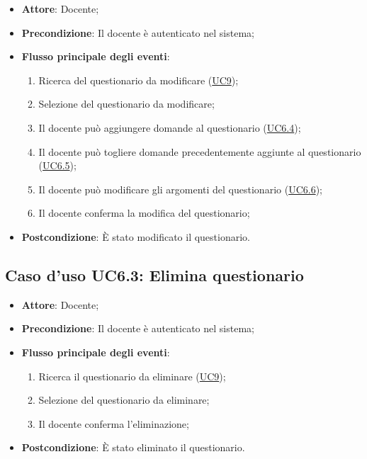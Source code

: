 \documentclass[12pt,a4paper]{article}
\begin{document}
\begin{itemize}

\item \textbf{Attore}: Docente; 
\item \textbf{Precondizione}: Il docente è autenticato nel sistema;

\item \textbf{Flusso principale degli eventi}:
\begin{enumerate}
	\item Ricerca del questionario da modificare (\hyperlink{UC9}{UC9});
	\item Selezione del questionario da modificare;
	\item Il docente può aggiungere domande al questionario (\hyperlink{UC6.4}{UC6.4});
	\item Il docente può togliere domande precedentemente aggiunte al questionario (\hyperlink{UC6.5}{UC6.5});
	\item Il docente può modificare gli argomenti del questionario (\hyperlink{UC6.6}{UC6.6});
	\item Il docente conferma la modifica del questionario;
	
\end{enumerate}
\item \textbf{Postcondizione}: È stato modificato il questionario.
\end{itemize}
\hypertarget{UC6.3}{}
\subsection{Caso d'uso UC6.3: Elimina questionario}

\begin{itemize}

\item \textbf{Attore}: Docente; 
\item \textbf{Precondizione}: Il docente è autenticato nel sistema;

\item \textbf{Flusso principale degli eventi}:
\begin{enumerate}
	\item Ricerca il questionario da eliminare (\hyperlink{UC9}{UC9});
	\item Selezione del questionario da eliminare;
	\item Il docente conferma l'eliminazione;
	
\end{enumerate}
\item \textbf{Postcondizione}: È stato eliminato il questionario.
\end{itemize}
\hypertarget{UC6.4}{}
\end{document}
